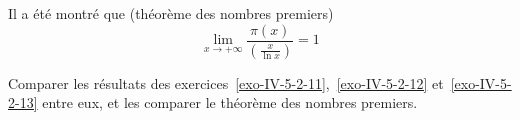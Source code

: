 \begin{exo}
Il a été montré que (théorème des nombres premiers)
$$\lim_{x \to + \infty} \frac{\pi(x)}{\left(\frac{x}{\ln x}\right)} = 1$$

Comparer les résultats des exercices~\ref{exo-IV-5-2-11},~\ref{exo-IV-5-2-12} et~\ref{exo-IV-5-2-13} entre eux, et les comparer le théorème des nombres premiers.
\end{exo}











